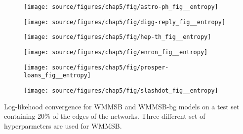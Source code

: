 

\begin{subfigure}
     \centering
         \texttt{[image: source/figures/chap5/fig/astro-ph\_fig\_\_entropy]}
\end{subfigure}
\begin{subfigure}
         \centering
      \texttt{[image: source/figures/chap5/fig/digg-reply\_fig\_\_entropy]}               
\end{subfigure}                                                                          
\begin{subfigure}                                                                        
         \centering                                                                      
      \texttt{[image: source/figures/chap5/fig/hep-th\_fig\_\_entropy]}
\end{subfigure}                                                                          
\begin{subfigure}                                                                        
     \centering                                                                          
         \texttt{[image: source/figures/chap5/fig/enron\_fig\_\_entropy]}
\end{subfigure}
\begin{subfigure}
         \centering
      \texttt{[image: source/figures/chap5/fig/prosper-loans\_fig\_\_entropy]}
\end{subfigure}                                                             
\begin{subfigure}                                                           
         \centering                                                         
      \texttt{[image: source/figures/chap5/fig/slashdot\_fig\_\_entropy]}
\end{subfigure}                                                             
\caption{Log-likehood convergence for WMMSB and WMMSB-bg models on a test set containing 20\% of the edges of the networks. Three different set of hyperparmeters are used for WMMSB.}

